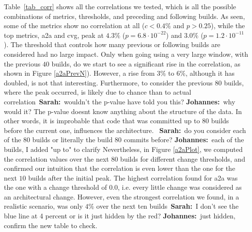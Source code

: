 \documentclass[sigplan, anonymous, review]{acmart}
\newcommand{\sn}[1]{{\color{blue}\textbf{Sarah:}~#1}}
\newcommand{\jk}[1]{{\color{violet}\textbf{Johannes:}~#1}}
\begin{document}
Table~\ref{tab_corr} shows all the correlations we tested, which is all the possible combinations of metrics, thresholds, and preceding and following builds. As seen, some of the metrics show no correlation at all ($c < 0.4\%$ and $p > 0.25$), while the top metrics, a2a and cvg, peak at $4.3\%$ ($p = 6.8 \cdot 10^{-22}$) and $3.0\%$ ($p=1.2 \cdot 10^{-11}$). 
The threshold that controls how many previous or following builds are considered had no large impact. Only when going using a very large window, with the previous $40$ builds, do we start to see a significant rise in the correlation, as shown in Figure \ref{a2aPrevN}). However, a rise from $3\%$ to $6\%$, although it has doubled, is not that interesting. Furthermore, to consider the previous $80$ builds, where the peak occurred, is likely due to chance than to actual correlation~\sn{wouldn't the p-value have told you this?} \jk{why would it? The p-value doesnt know anything about the structure of the data}. In other words, it is improbable that code that was committed up to $80$ builds before the current one, influences the architecture. ~\sn{do you consider each of the 80 builds or literally the build 80 commits before?} \jk{each of the builds, I added "up to" to clarify}
Nevertheless, in Figure \ref{a2aPlot}, we computed the correlation values over the next $80$ builds for different change thresholds, and confirmed our intuition that the correlation is even lower than the one for the next $10$ builds after the initial peak.
The highest correlation found for a2a was the one with a change threshold of $0.0$, i.e. every little change was considered as an architectural change. However, even the strongest correlation we found, in a realistic scenario, was only $4\%$ over the next ten builds~\sn{I don't see the blue line at 4 percent or is it just hidden by the red?} \jk{just hidden, confirm the new table to check}. 
\end{document}
